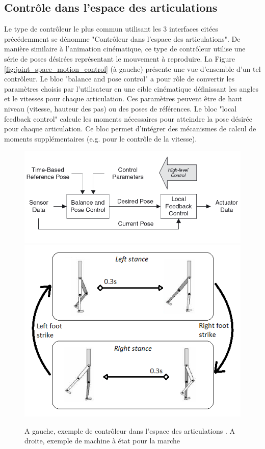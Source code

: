 \documentclass[runningheads,a4paper]{llncs}
\begin{document}
\subsection{Contrôle dans l'espace des articulations} 
Le type de contrôleur le plus commun utilisant les 3 interfaces citées précédemment se dénomme "Contrôleur dans l'espace des articulations".
De manière similaire à l'animation cinématique, ce type de contrôleur utilise une série de poses désirées représentant le mouvement à reproduire. La Figure \ref{fig:joint_space_motion_control} (à gauche) présente une vue d'ensemble d'un tel contrôleur. Le bloc "balance and pose control" a pour rôle de convertir les paramètres choisis par l'utilisateur en une cible cinématique définissant les angles et le vitesses pour chaque articulation. Ces paramètres peuvent être de haut niveau (vitesse, hauteur des pas) ou des poses de références. Le bloc "local feedback control" calcule les moments nécessaires pour atteindre la pose désirée pour chaque articulation. Ce bloc permet d'intégrer des mécanismes de calcul de moments supplémentaires (e.g. pour le contrôle de la vitesse). 
\begin{figure}[h]
\centering
\includegraphics[scale=0.4]{joint_space_motion_control.png}
\includegraphics[scale=0.5]{state_machine.png}
\caption{A gauche, exemple de contrôleur dans l'espace des articulations \cite{geijtenbeek2012interactive}. A droite, exemple de machine à état pour la marche \cite{yin2007simbicon}}
\label{fig:joint_space_motion_control}
\label{fig:state_machine}
\end{figure}
\end{document}
